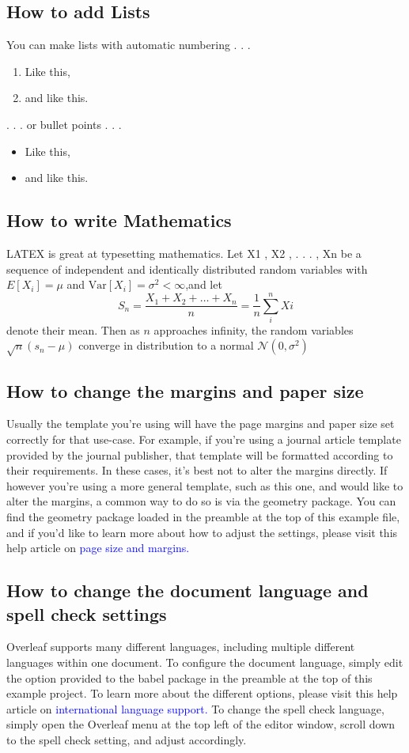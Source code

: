 \documentclass{article}
\begin{document}
{\subsection{How to add Lists}
You can make lists with automatic numbering . . .
\begin{enumerate}
\item Like this,
\item and like this.
\end{enumerate}
. . . or bullet points . . . 
\begin{itemize}
\item Like this,
\item and like this. 	
\end{itemize} 
\subsection{How to write Mathematics}
LATEX is great at typesetting mathematics. Let X1 , X2 , . . . , Xn be a sequence of independent and identically distributed 
random variables with $E[X_i] = \mu$ and $\text{Var}[X_i] = \sigma^2 < \infty$,and let
\[
 S_n=\frac{X_1+X_2+ \dots + X_n}{n}=\frac{1}{n} \sum_{i}^{n} Xi
 \] 
denote their mean. Then as $n$ approaches infinity, the random variables
 $\sqrt{n}(s_n - \mu)$ converge in distribution to a normal $\mathcal{N}(0, \sigma^2)$
 \subsection{How to change the margins and paper size}
Usually the template you’re using will have the page margins and paper size set correctly for that
use-case. For example, if you’re using a journal article template provided by the journal publisher,
that template will be formatted according to their requirements. In these cases, it’s best not to alter
the margins directly.\newline
If however you’re using a more general template, such as this one, and would like to alter the
margins, a common way to do so is via the geometry package. You can find the geometry package
loaded in the preamble at the top of this example file, and if you’d like to learn more about how to
adjust the settings, please visit this help article on \textcolor{blue}{page size and margins.}
\subsection{How to change the document language and spell check settings}	
Overleaf supports many different languages, including multiple different languages within one document.\newline
To configure the document language, simply edit the option provided to the babel package in the
preamble at the top of this example project. To learn more about the different options, please visit
this help article on \textcolor{blue}{international language support.}\newline
To change the spell check language, simply open the Overleaf menu at the top left of the editor
window, scroll down to the spell check setting, and adjust accordingly.
}
\end{document}
